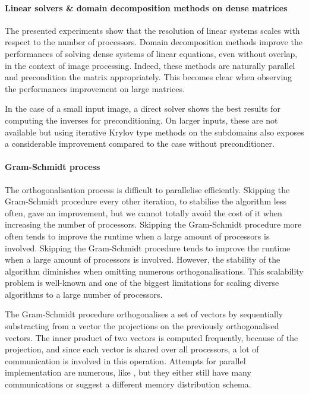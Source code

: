 \paragraph{Linear solvers \& domain decomposition methods on dense matrices}
The presented experiments show that the resolution of linear systems scales with respect to the number of processors.
Domain decomposition methods improve the performances of solving dense systems of linear equations, even without overlap, in the context of image processing.
Indeed, these methods are naturally parallel and precondition the matrix appropriately.
This becomes clear when observing the performances improvement on large matrices.

\ifthesis
 In the case of a small input image, a direct solver shows the best results for computing the inverses for preconditioning.
 On larger inputs, these are not available but using iterative Krylov type methods on the subdomains also exposes a considerable improvement compared to the case without preconditioner.
\fi

\paragraph{Gram-Schmidt process}
The orthogonalisation process is difficult to parallelise efficiently.
\ifthesis
 Skipping the Gram-Schmidt procedure every other iteration, to stabilise the algorithm less often, gave an improvement, but we cannot totally avoid the cost of it when increasing the number of processors.
 Skipping the Gram-Schmidt procedure more often tends to improve the runtime when a large amount of processors is involved.
\else
 Skipping the Gram-Schmidt procedure tends to improve the runtime when a large amount of processors is involved.
\fi
However, the stability of the algorithm diminishes when omitting numerous orthogonalisations.
This scalability problem is well-known and one of the biggest limitations for scaling diverse algorithms to a large number of processors.

The Gram-Schmidt procedure orthogonalises a set of vectors by sequentially substracting from a vector the projections on the previously orthogonalised vectors.
The inner product of two vectors is computed frequently, because of the projection, and since each vector is shared over all processors, a lot of communication is involved in this operation.
Attempts for parallel implementation are numerous, like \cite{katagiri_parallel_gram_schmidt_2003}, but they either still have many communications or suggest a different memory distribution schema.
